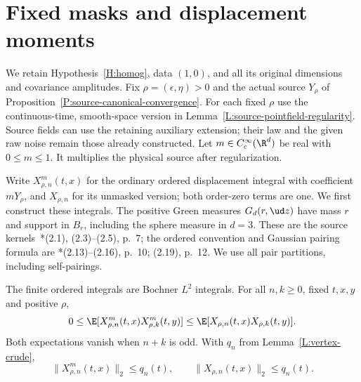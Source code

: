 \section{Fixed masks and displacement moments}
\label{S:masked-moments}

We retain Hypothesis~\ref{H:homog}, data $(1,0)$, and all its original
dimensions and covariance amplitudes. Fix $\rho=(\epsilon,\eta)>0$ and
the actual source $Y_\rho$ of Proposition~\ref{P:source-canonical-convergence}.
For each fixed $\rho$ use the continuous-time, smooth-space version in
Lemma~\ref{L:source-pointfield-regularity}. Source fields can use the
retaining auxiliary extension; their law and the given raw noise remain
those already constructed. Let $m\in C_c^\infty(\R^d)$ be real with
$0\le m\le1$. It multiplies the physical source after regularization.

Write $X_{\rho,n}^m(t,x)$ for the ordinary ordered displacement integral
with coefficient $mY_\rho$, and $X_{\rho,n}$ for its unmasked version;
both order-zero terms are one. We first construct these integrals.
The positive Green measures $G_d(r,\ud z)$ have mass $r$ and support in
$B_r$, including the sphere measure in $d=3$. These are the source
kernels~\cite{chen:author2026:time-dependency}*{(2.1), (2.3)--(2.5),
p.~7}; the ordered convention and Gaussian pairing formula are
\cite{chen:author2026:time-dependency}*{(2.13)--(2.16), p.~10;
(2.19), p.~12}. We use all pair partitions, including self-pairings.

\begin{lemma}
  \label{L:masked-chain-comparison}
  The finite ordered integrals are Bochner $L^2$ integrals. For all
  $n,k\ge0$, fixed $t,x,y$ and positive $\rho$,
  \begin{equation}\label{E:masked-order-comparison}
    0\le \E[X_{\rho,n}^m(t,x)X_{\rho,k}^m(t,y)]
    \le \E[X_{\rho,n}(t,x)X_{\rho,k}(t,y)].
  \end{equation}
  Both expectations vanish when $n+k$ is odd. With $q_n$ from
  Lemma~\ref{L:vertex-crude},
  \begin{equation}\label{E:masked-order-bound}
    \|X_{\rho,n}^m(t,x)\|_2\le q_n(t),\qquad
    \|X_{\rho,n}(t,x)\|_2\le q_n(t).
  \end{equation}
\end{lemma}

